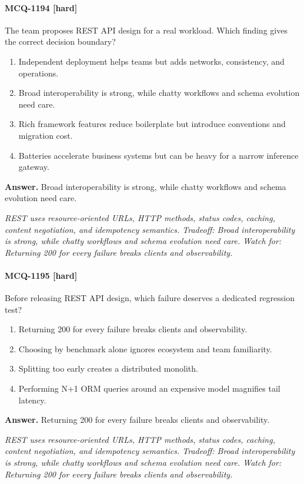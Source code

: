 \paragraph{MCQ-1194 [hard]} The team proposes REST API design for a real workload. Which finding gives the correct decision boundary?
\begin{enumerate}[label=\Alph*.]
\item Independent deployment helps teams but adds networks, consistency, and operations.
\item Broad interoperability is strong, while chatty workflows and schema evolution need care.
\item Rich framework features reduce boilerplate but introduce conventions and migration cost.
\item Batteries accelerate business systems but can be heavy for a narrow inference gateway.
\end{enumerate}
\noindent\textbf{Answer.} Broad interoperability is strong, while chatty workflows and schema evolution need care.
\par\textit{REST uses resource-oriented URLs, HTTP methods, status codes, caching, content negotiation, and idempotency semantics. Tradeoff: Broad interoperability is strong, while chatty workflows and schema evolution need care. Watch for: Returning 200 for every failure breaks clients and observability.}
\paragraph{MCQ-1195 [hard]} Before releasing REST API design, which failure deserves a dedicated regression test?
\begin{enumerate}[label=\Alph*.]
\item Returning 200 for every failure breaks clients and observability.
\item Choosing by benchmark alone ignores ecosystem and team familiarity.
\item Splitting too early creates a distributed monolith.
\item Performing N+1 ORM queries around an expensive model magnifies tail latency.
\end{enumerate}
\noindent\textbf{Answer.} Returning 200 for every failure breaks clients and observability.
\par\textit{REST uses resource-oriented URLs, HTTP methods, status codes, caching, content negotiation, and idempotency semantics. Tradeoff: Broad interoperability is strong, while chatty workflows and schema evolution need care. Watch for: Returning 200 for every failure breaks clients and observability.}
